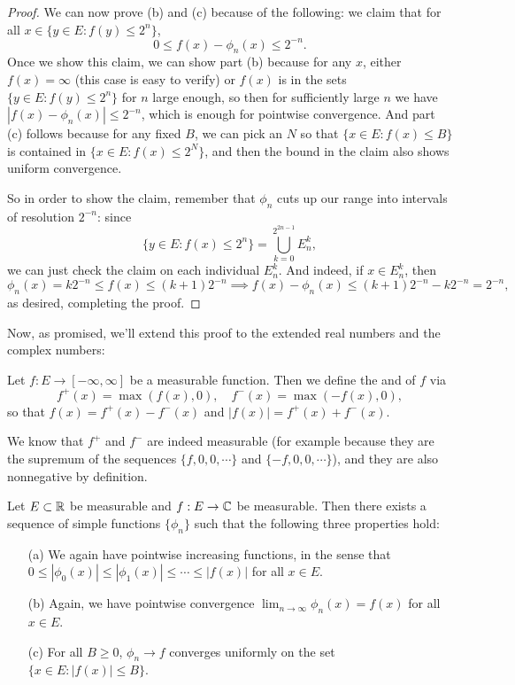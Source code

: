 \begin{proof}
We can now prove (b) and (c) because of the following: we claim that for all $x \in \{y \in E: f(y) \le 2^n\}$,
\[
    0  \le f(x) - \phi_n(x) \le 2^{-n}. 
\]
Once we show this claim, we can show part (b) because for any $x$, either $f(x) = \infty$ (this case is easy to verify) or $f(x)$ is in the sets $\{y \in E: f(y) \le 2^n\}$ for $n$ large enough, so then for sufficiently large $n$ we have $|f(x) - \phi_n(x)| \le 2^{-n}$, which is enough for pointwise convergence. And part (c) follows because for any fixed $B$, we can pick an $N$ so that $\{x \in E: f(x) \le B\}$ is contained in $\{x \in E: f(x) \le 2^N\}$, and then the bound in the claim also shows uniform convergence. 

So in order to show the claim, remember that $\phi_n$ cuts up our range into intervals of resolution $2^{-n}$: since
\[
    \{y \in E: f(x) \le 2^n\} = \bigcup_{k=0}^{2^{2n-1}} E_n^k,
\]
we can just check the claim on each individual $E_n^k$. And indeed, if $x \in E_n^k$, then 
\[
    \phi_n(x) = k 2^{-n} \le f(x) \le (k+1) 2^{-n} \implies f(x) - \phi_n(x) \le (k+1)2^{-n} - k2^{-n} = 2^{-n},
\]
as desired, completing the proof. 
\end{proof}

Now, as promised, we'll extend this proof to the extended real numbers and the complex numbers:

\begin{definition}
Let $f: E \to [-\infty, \infty]$ be a measurable function. Then we define the  and  of $f$ via 
\[
    f^+(x) = \max(f(x), 0), \quad f^-(x) = \max(-f(x), 0),
\]
so that $f(x) = f^+(x) - f^-(x)$ and $|f(x)| = f^+(x) + f^-(x)$.
\end{definition}

We know that $f^+$ and $f^-$ are indeed measurable (for example because they are the supremum of the sequences $\{f, 0, 0, \cdots\}$ and $\{-f, 0, 0, \cdots\}$), and they are also nonnegative by definition.

\begin{theorem}
Let $E \subset \mathbb R$ be measurable and $f: E \to \mathbb C$ be measurable. Then there exists a sequence of simple functions $\{\phi_n\}$ such that the following three properties hold:
\begin{itemize}
\item[(a)] We again have pointwise increasing functions, in the sense that $0 \le |\phi_0(x)| \le |\phi_1(x)| \le \cdots \le |f(x)|$ for all $x \in E$.
\item[(b)] Again, we have pointwise convergence $\lim_{n \to \infty} \phi_n(x) = f(x)$ for all $x \in E$.
\item[(c)] For all $B \ge 0$, $\phi_n \to f$ converges uniformly on the set $\{x \in E: |f(x)| \le B\}$.
\end{itemize}
\end{theorem}

